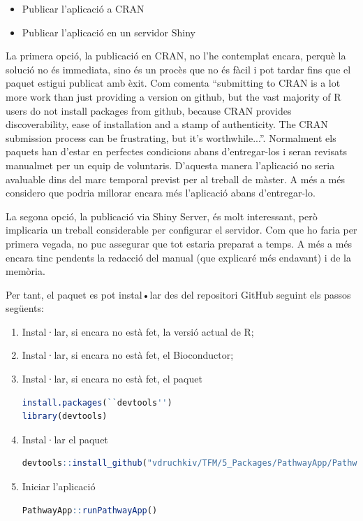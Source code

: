 \documentclass[]{article}
\begin{document}
\begin{itemize}
\item Publicar l'aplicació a CRAN
\item Publicar l'aplicació en un servidor Shiny
\end{itemize}
La primera opció, la publicació en CRAN, no l’he contemplat encara, perquè la solució no és immediata, sino és un procès que no és fàcil i pot tardar fins que el paquet estigui publicat amb èxit. Com comenta \cite{HWick} \enquote{submitting to CRAN is a lot more work than just providing a version on github, but the vast majority of R users do not install packages from github, because CRAN provides discoverability, ease of installation and a stamp of authenticity. The CRAN submission process can be frustrating, but it’s worthwhile...}. Normalment els paquets han d’estar en perfectes condicions abans d'entregar-los i seran revisats manualmet per un equip de voluntaris. D'aquesta manera l'aplicació no seria avaluable dins del marc temporal previst per al treball de màster. A més a més considero que podria millorar encara més l'aplicació abans d'entregar-lo.

La segona opció, la publicació via Shiny Server, és molt interessant, però implicaria un treball considerable per configurar el servidor. Com que ho faria per primera vegada, no puc assegurar que tot estaria preparat a temps. A més a més encara tinc pendents la redacció del manual (que explicaré més endavant) i de la memòria. 

Per tant, el paquet  es pot instal•lar des del repositori GitHub seguint els passos següents:

\begin{enumerate}
\item Instal·lar, si encara no està fet, la versió actual de R;

\item Instal·lar, si encara no està fet, el Bioconductor;

\item Instal·lar, si encara no està fet, el paquet 

\begin{lstlisting}[language=R]
install.packages(``devtools'')
library(devtools)
\end{lstlisting}

\item Instal·lar el paquet 

\begin{lstlisting}[language=R]
devtools::install_github("vdruchkiv/TFM/5_Packages/PathwayApp/PathwayApp")
\end{lstlisting}

\item Iniciar l'aplicació 
\begin{lstlisting}[language=R]
PathwayApp::runPathwayApp()
\end{lstlisting}
\end{enumerate}
\end{document}
